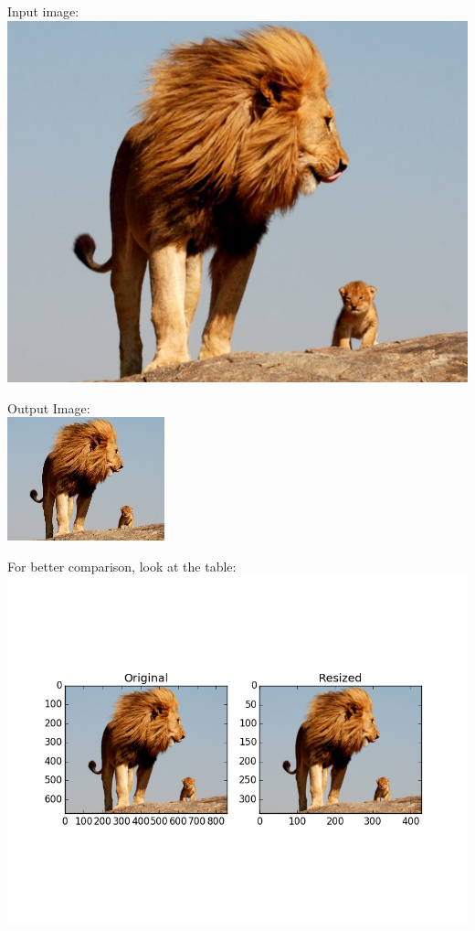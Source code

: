 \documentclass[]{article}
\begin{document}
Input image:\\
\includegraphics{original.jpg}

Output Image:\\
\includegraphics{res.jpg}

For better comparison, look at the table:
\centering
\includegraphics{resizecomp.png}
\end{document}
